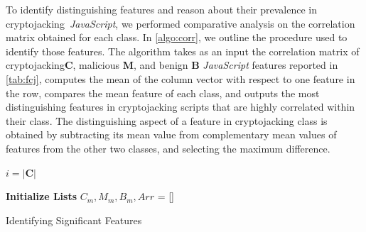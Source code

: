 \documentclass[acmlarge]{acmart}
\newcommand{\js}{{\em JavaScript}\xspace}
\newcommand{\cj}{cryptojacking\xspace}
\begin{document}
To identify distinguishing features and reason about their prevalence in \cj~\js, we performed comparative analysis on the correlation matrix obtained for each class. In \autoref{algo:corr}, we outline the procedure used to identify those features. The algorithm takes as an input the correlation matrix of \cj \textbf{C}, malicious \textbf{M}, and benign \textbf{B} \js features reported in \autoref{tab:fcj}, computes the mean of the column vector with respect to one feature in the row, compares the mean feature of each class, and outputs the most distinguishing features in \cj scripts that are highly correlated within their class. The distinguishing aspect of a feature in cryptojacking class is obtained by subtracting its mean value from complementary mean values of features from the other two classes, and selecting the maximum difference.


\begin{algorithm}[t]  

$i = |\textbf{C}|$\;

\textbf{Initialize Lists} $C_{m}, M_{m}, B_{m}, Arr$ = []\;


  \caption{Identifying Significant Features}
\label{algo:corr}
\end{algorithm}
\end{document}
